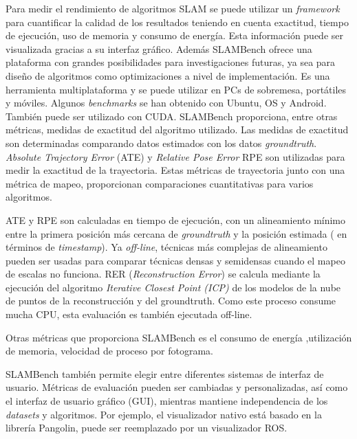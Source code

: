 \begin {enumerate}
Para medir el rendimiento de algoritmos SLAM se puede utilizar un \textit{framework} para cuantificar la calidad de los resultados teniendo en cuenta exactitud, tiempo de ejecución, uso de memoria y consumo de energía. Esta información puede ser visualizada gracias a su interfaz gráfico.
Además SLAMBench ofrece una plataforma con grandes posibilidades para investigaciones futuras, ya sea para diseño de algoritmos como optimizaciones a nivel de implementación. Es una herramienta multiplataforma y se puede utilizar en PCs de sobremesa, portátiles y móviles. Algunos \textit{benchmarks} se han obtenido con Ubuntu, OS y Android.
También puede ser utilizado con CUDA.
SLAMBench proporciona, entre otras métricas, medidas de exactitud del algoritmo utilizado. Las medidas de exactitud son determinadas comparando datos estimados con los datos \textit{groundtruth}.
\textit{Absolute Trajectory Error} (ATE) y \textit{Relative Pose Error} RPE son utilizadas para medir la exactitud de la trayectoria. Estas métricas de trayectoria junto con una métrica de mapeo, proporcionan comparaciones cuantitativas para varios algoritmos.

ATE y RPE son calculadas en tiempo de ejecución, con un alineamiento mínimo entre la primera posición más cercana de \textit{groundtruth} y la posición estimada ( en términos de \textit{timestamp}). Ya \textit{off-line}, técnicas más complejas de alineamiento pueden ser usadas para comparar técnicas densas y semidensas cuando el mapeo de escalas no funciona. RER (\textit{Reconstruction Error}) se calcula mediante la ejecución del algoritmo \textit{Iterative Closest Point (ICP)} de los modelos de la nube de puntos de la reconstrucción y del groundtruth. Como este proceso consume mucha CPU, esta evaluación es también ejecutada off-line.

Otras métricas que proporciona SLAMBench es el consumo de energía ,utilización de memoria, velocidad de proceso por fotograma.

SLAMBench también permite elegir entre diferentes sistemas de interfaz de usuario. Métricas de evaluación pueden ser cambiadas y personalizadas, así como el interfaz de usuario gráfico (GUI), mientras mantiene independencia de los \textit{datasets} y algoritmos. Por ejemplo, el visualizador nativo está basado en la librería Pangolin, puede ser reemplazado por un visualizador ROS.


\end{enumerate}
